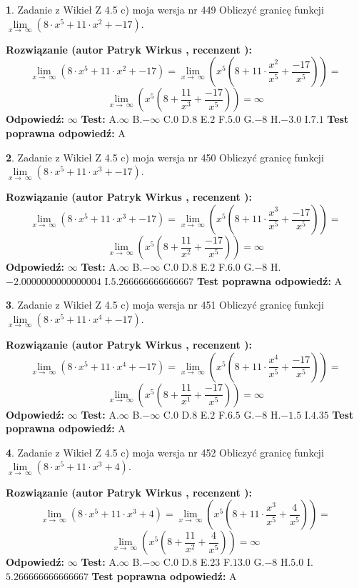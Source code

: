\documentclass[12pt, a4paper]{article}
\theoremstyle{definition} %
\newtheorem{zad}{}
\newcommand{\zadStart}[1]{\begin{zad}#1\newline}
\newcommand{\zadStop}{\end{zad}}
\newcommand{\rozwStart}[2]{\noindent \textbf{Rozwiązanie (autor #1 , recenzent #2): }\newline}
\newcommand{\rozwStop}{\newline}
\newcommand{\odpStart}{\noindent \textbf{Odpowiedź:}\newline}
\newcommand{\odpStop}{\newline}
\newcommand{\testStart}{\noindent \textbf{Test:}\newline}
\newcommand{\testStop}{\newline}
\newcommand{\kluczStart}{\noindent \textbf{Test poprawna odpowiedź:}\newline}
\newcommand{\kluczStop}{\newline}
\begin{document}
\zadStart{Zadanie z Wikieł Z 4.5 c) moja wersja nr 449}
Obliczyć granicę funkcji  $\lim\limits_{x\to\ \infty}(8 \cdot x^{5}+11 \cdot x^{2}+-17)$.
\zadStop
\rozwStart{Patryk Wirkus}{}
$$\lim\limits_{x\to\ \infty}(8 \cdot x^{5}+11 \cdot x^{2}+-17) = \lim\limits_{x\to\ \infty}(x^{5}(8 +11 \cdot \frac{x^{2}}{x^{5}}+\frac{-17}{x^{5}})) =$$ $$\lim\limits_{x\to\ \infty}(x^{5}(8 +\frac{11}{x^{3}}+\frac{-17}{x^{5}})) =\infty$$
\rozwStop
\odpStart
$\infty$
\odpStop
\testStart
A.$\infty$ B.$-\infty$ C.$0$ D.$8$ E.$2$
F.$5.0$ G.$-8$
H.$-3.0$
I.$7.1$
\testStop
\kluczStart
A
\kluczStop



\zadStart{Zadanie z Wikieł Z 4.5 c) moja wersja nr 450}
Obliczyć granicę funkcji  $\lim\limits_{x\to\ \infty}(8 \cdot x^{5}+11 \cdot x^{3}+-17)$.
\zadStop
\rozwStart{Patryk Wirkus}{}
$$\lim\limits_{x\to\ \infty}(8 \cdot x^{5}+11 \cdot x^{3}+-17) = \lim\limits_{x\to\ \infty}(x^{5}(8 +11 \cdot \frac{x^{3}}{x^{5}}+\frac{-17}{x^{5}})) =$$ $$\lim\limits_{x\to\ \infty}(x^{5}(8 +\frac{11}{x^{2}}+\frac{-17}{x^{5}})) =\infty$$
\rozwStop
\odpStart
$\infty$
\odpStop
\testStart
A.$\infty$ B.$-\infty$ C.$0$ D.$8$ E.$2$
F.$6.0$ G.$-8$
H.$-2.0000000000000004$
I.$5.266666666666667$
\testStop
\kluczStart
A
\kluczStop



\zadStart{Zadanie z Wikieł Z 4.5 c) moja wersja nr 451}
Obliczyć granicę funkcji  $\lim\limits_{x\to\ \infty}(8 \cdot x^{5}+11 \cdot x^{4}+-17)$.
\zadStop
\rozwStart{Patryk Wirkus}{}
$$\lim\limits_{x\to\ \infty}(8 \cdot x^{5}+11 \cdot x^{4}+-17) = \lim\limits_{x\to\ \infty}(x^{5}(8 +11 \cdot \frac{x^{4}}{x^{5}}+\frac{-17}{x^{5}})) =$$ $$\lim\limits_{x\to\ \infty}(x^{5}(8 +\frac{11}{x^{1}}+\frac{-17}{x^{5}})) =\infty$$
\rozwStop
\odpStart
$\infty$
\odpStop
\testStart
A.$\infty$ B.$-\infty$ C.$0$ D.$8$ E.$2$
F.$6.5$ G.$-8$
H.$-1.5$
I.$4.35$
\testStop
\kluczStart
A
\kluczStop



\zadStart{Zadanie z Wikieł Z 4.5 c) moja wersja nr 452}
Obliczyć granicę funkcji  $\lim\limits_{x\to\ \infty}(8 \cdot x^{5}+11 \cdot x^{3}+4)$.
\zadStop
\rozwStart{Patryk Wirkus}{}
$$\lim\limits_{x\to\ \infty}(8 \cdot x^{5}+11 \cdot x^{3}+4) = \lim\limits_{x\to\ \infty}(x^{5}(8 +11 \cdot \frac{x^{3}}{x^{5}}+\frac{4}{x^{5}})) =$$ $$\lim\limits_{x\to\ \infty}(x^{5}(8 +\frac{11}{x^{2}}+\frac{4}{x^{5}})) =\infty$$
\rozwStop
\odpStart
$\infty$
\odpStop
\testStart
A.$\infty$ B.$-\infty$ C.$0$ D.$8$ E.$23$
F.$13.0$ G.$-8$
H.$5.0$
I.$5.266666666666667$
\testStop
\kluczStart
A
\kluczStop
\end{document}
